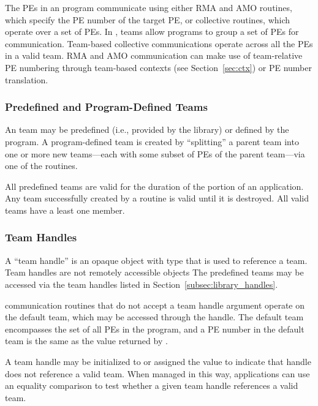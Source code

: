 The \acp{PE} in an \openshmem program communicate using either
\ac{RMA} and \ac{AMO} routines, which specify the \ac{PE} number of the target
\ac{PE}, or collective routines, which operate over a set of \acp{PE}.
In \openshmem, teams allow programs to group a set of \acp{PE} for
communication.
Team-based collective communications operate across all the \acp{PE}
in a valid team.
\ac{RMA} and \ac{AMO} communication can make use of team-relative \ac{PE}
numbering through team-based contexts (see Section~\ref{sec:ctx}) or
\ac{PE} number translation.

\subsubsection*{Predefined and Program-Defined Teams}

An \openshmem team may be predefined (i.e., provided by the \openshmem
library) or defined by the \openshmem program.
A program-defined team is created by ``splitting'' a parent team into
one or more new teams---each with some subset of \acp{PE} of the
parent team---via one of the  routines.

All predefined teams are valid for the duration of the \openshmem
portion of an application.
Any team successfully created by a 
routine is valid until it is destroyed.
All valid teams have a least one member.

\subsubsection*{Team Handles}

A ``team handle'' is an opaque object with type 
that is used to reference a team.
Team handles are not remotely accessible objects
The predefined teams may be accessed via the team handles listed in
Section~\ref{subsec:library_handles}.

\openshmem communication routines that do not accept a team handle
argument operate on the default team, which may be accessed through
the  handle.
The default team encompasses the set of all \acp{PE} in the \openshmem
program, and a \ac{PE} number in the default team is the same as the
value returned by .

A team handle may be initialized to or assigned the value
 to indicate that handle does not
reference a valid team.
When managed in this way, applications can use an equality comparison
to test whether a given team handle references a valid team.

